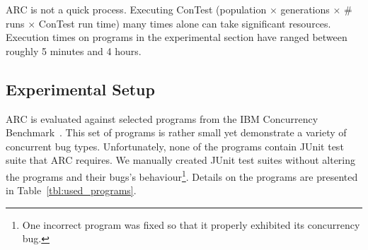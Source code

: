 \documentclass{llncs}
\begin{document}

ARC is not a quick process. Executing ConTest (population $\times$ generations
$\times$ \# runs $\times$ ConTest run time) many times alone can take significant
resources. Execution times on programs in the experimental section have ranged between
roughly 5 minutes and 4 hours.

\subsection{Experimental Setup}
\label{sec:experimental_setup}

ARC is evaluated against selected programs from the IBM Concurrency
Benchmark~\cite{EHSU06}. This set of programs is rather small yet demonstrate a
variety of concurrent bug types. Unfortunately, none of the programs contain
JUnit test suite that ARC requires. We manually created JUnit test suites
without altering the programs and their bugs's behaviour\footnote{One incorrect
program was fixed so that it properly exhibited its concurrency bug.}. Details
on the programs are presented in Table~\ref{tbl:used_programs}.

\end{document}
